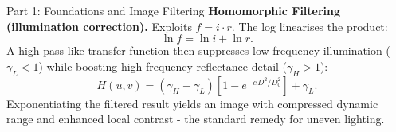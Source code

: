 \documentclass[letterpaper]{article}
\begin{document}
\begin{notes}{Part 1: Foundations and Image Filtering}
\textbf{Homomorphic Filtering (illumination correction).} Exploits $f = i \cdot r$. The log linearises the product:
$$\ln f = \ln i + \ln r.$$
A high-pass-like transfer function then suppresses low-frequency illumination ($\gamma_L < 1$) while boosting high-frequency reflectance detail ($\gamma_H > 1$):
$$H(u,v) = (\gamma_H - \gamma_L)\!\left[1 - e^{-c\,D^2/D_0^2}\right] + \gamma_L.$$
Exponentiating the filtered result yields an image with compressed dynamic range and enhanced local contrast - the standard remedy for uneven lighting.



\end{notes}
\end{document}
